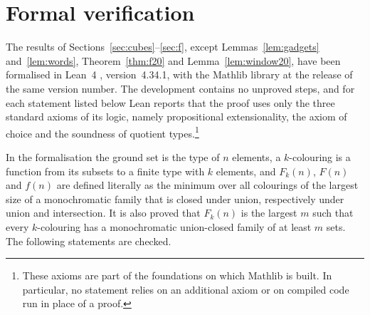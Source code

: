 \documentclass[11pt,reqno]{amsart}
\numberwithin{equation}{section}
\theoremstyle{plain}
\theoremstyle{definition}
\theoremstyle{remark}
\begin{document}
\section{Formal verification}
\label{sec:lean}

The results of Sections~\ref{sec:cubes}--\ref{sec:f}, except
Lemmas~\ref{lem:gadgets} and~\ref{lem:words}, Theorem~\ref{thm:f20} and
Lemma~\ref{lem:window20}, have been formalised in
Lean~4 \cite{MU21}, version~4.34.1, with the Mathlib library
\cite{Mathlib20} at the release of the same version number. The
development contains no unproved steps, and for each statement listed
below Lean reports that the proof uses only the three standard axioms of
its logic, namely propositional extensionality, the axiom of choice and
the soundness of quotient types.\footnote{These axioms are part of the
foundations on which Mathlib is built. In particular, no statement relies
on an additional axiom or on compiled code run in place of a proof.}

In the formalisation the ground set is the type of $n$ elements, a
$k$-colouring is a function from its subsets to a finite type with $k$
elements, and $F_k(n)$, $F(n)$ and $f(n)$ are defined literally as the
minimum over all colourings of the largest size of a monochromatic
family that is closed under union, respectively under union and
intersection. It is also proved that $F_k(n)$ is the largest $m$ such that
every $k$-colouring has a monochromatic union-closed family of at least
$m$ sets. The following statements are checked.
\end{document}

